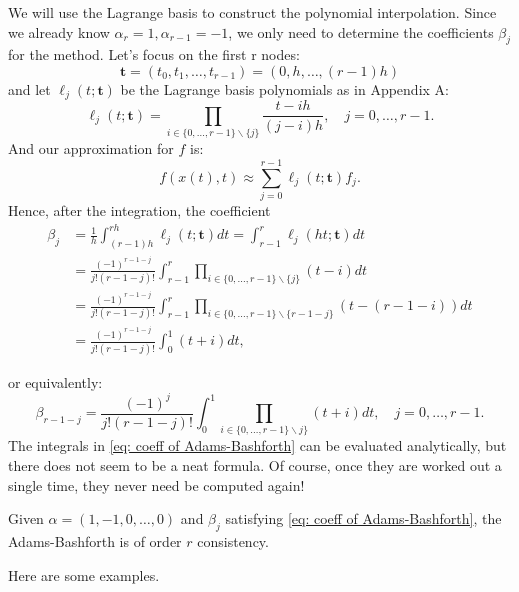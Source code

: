 We will use the Lagrange basis to construct the polynomial interpolation. Since we already know $ \alpha _r=1, \alpha _{r-1}=-1 $, we only need to determine the coefficients $ \beta _j $ for the method. Let's focus on the first r nodes: 
\[
    \mathbf{t}=\left(t_0, t_1, \ldots, t_{r-1}\right)=(0, h, \ldots,(r-1) h)
\]
and let $\ell_j(t ; \mathbf{t})$ be the Lagrange basis polynomials as in Appendix A:
$$
\ell_j(t ; \mathbf{t})=\prod_{i \in\{0, \ldots, r-1\} \backslash\{j\}} \frac{t-i h}{(j-i) h}, \quad j=0, \ldots, r-1. 
$$
And our approximation for $ f $ is: 
\[
    f(x(t), t) \approx \sum_{j=0}^{r-1} \ell_j(t ; \mathbf{t}) f_j. 
\]
Hence, after the integration, the coefficient 
\[
    \begin{aligned}
        \beta_j & =\frac{1}{h} \int_{(r-1) h}^{r h} \ell_j(t ; \mathbf{t}) d t  =\int_{r-1}^r \ell_j(h t ; \mathbf{t}) d t \\
        & =\frac{(-1)^{r-1-j}}{j !(r-1-j) !} \int_{r-1}^r \prod_{i \in\{0, \ldots, r-1\} \backslash\{j\}}(t-i) d t \\
        & =\frac{(-1)^{r-1-j}}{j !(r-1-j) !} \int_{r-1}^r \prod_{i \in\{0, \ldots, r-1\} \backslash\{r-1-j\}}(t-(r-1-i)) d t \\
        & =\frac{(-1)^{r-1-j}}{j !(r-1-j) !} \int_0^1(t+i) d t,
        \end{aligned}
\]

or equivalently:
\begin{equation}
\label{eq: coeff of Adams-Bashforth}
    \beta_{r-1-j}=\frac{(-1)^j}{j !(r-1-j) !} \int_0^1 \prod_{i \in\{0, \ldots, r-1\} \backslash j\}}(t+i) d t, \quad j=0, \ldots, r-1. 
\end{equation}
The integrals in \eqref{eq: coeff of Adams-Bashforth} can be evaluated analytically, but there does not seem to be a neat formula. Of course, once they are worked out a single time, they never need be computed again!


\begin{theorem}
\label{thm: consistency of Adams-Bashforth}
Given $ \alpha = (1,-1,0,\ldots ,0) $ and $ \beta _j $ satisfying \eqref{eq: coeff of Adams-Bashforth}, the Adams-Bashforth is of order $ r $ consistency. 
\end{theorem}

Here are some examples. 

